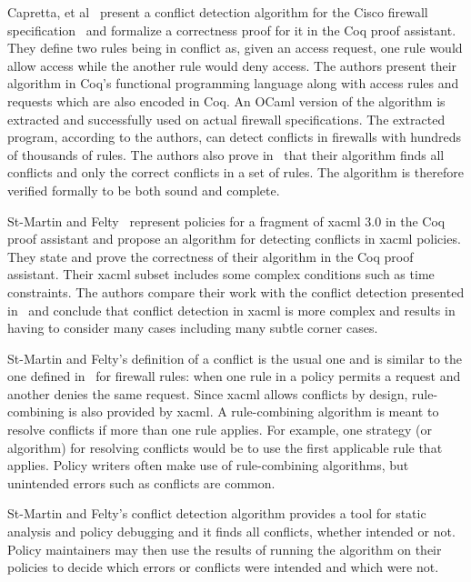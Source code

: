 Capretta, et al~\cite{CaprettaSFM07} present a conflict detection algorithm for the Cisco firewall specification~\cite{ciscofirewall} and formalize a correctness proof for it in the Coq proof assistant. They define two rules being in conflict as, given an access request, one rule would allow access while the another rule would deny access. The authors present their algorithm in Coq's functional programming language along with access rules and requests which are also encoded in Coq. An OCaml version of
the algorithm is extracted and successfully used on actual firewall specifications. The extracted program, according to the authors, can detect conflicts in firewalls with hundreds of thousands of rules. The authors also prove in~\cite{CaprettaSFM07} that their algorithm finds all conflicts and only the correct conflicts in a set of rules. The algorithm is therefore verified formally to be both sound and complete.

St-Martin and Felty~\cite{felty16} represent policies for a fragment of \ac{xacml} 3.0 in the Coq proof assistant and propose an algorithm for detecting conflicts in \ac{xacml} policies. They state and prove the correctness of their algorithm in the Coq proof assistant. Their \ac{xacml} subset includes some complex conditions such as time constraints. The authors compare their work with the conflict detection presented in~\cite{CaprettaSFM07} and conclude that conflict detection in \ac{xacml} is more complex and results in having to consider many cases including many subtle corner cases. 

St-Martin and Felty's definition of a conflict is the usual one and is similar to the one defined in~\cite{CaprettaSFM07} for firewall rules: when one rule in a policy permits a request and another denies the same request. Since \ac{xacml} allows conflicts by design, rule-combining is also provided by \ac{xacml}. A rule-combining algorithm is meant to resolve conflicts if more than one rule applies. For example, one strategy (or algorithm) for resolving conflicts would be to use the first applicable rule that applies. Policy writers often make use of rule-combining algorithms, but unintended errors such as conflicts are common.

St-Martin and Felty's conflict detection algorithm provides a tool for static analysis and policy debugging and it finds all conflicts, whether intended or not. Policy maintainers may then use the results of running the algorithm on their policies to decide which errors or conflicts were intended and which were not.





























